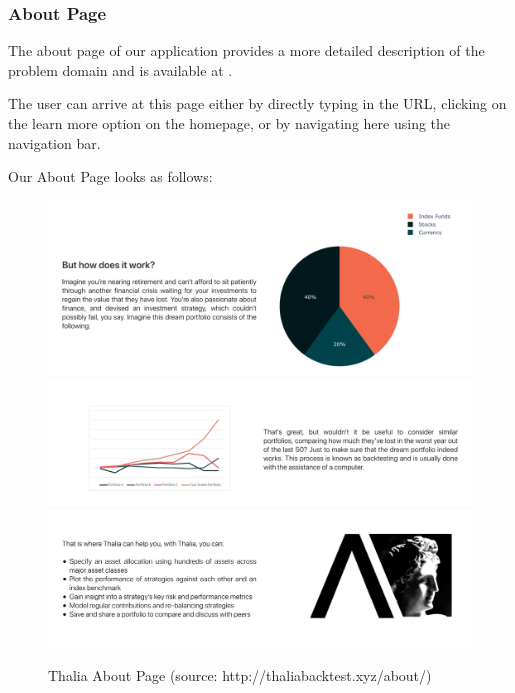 \documentclass[main.tex]{subfiles}
\begin{document}
\subsubsection{About Page}
The about page of our application provides a more detailed description of the problem domain and is available at .

The user can arrive at this page either by directly typing in the URL, clicking on the learn more option on the homepage, or by navigating here using the navigation bar.

Our About Page looks as follows:

\begin{figure}[H]
   \centering
   \includegraphics[width=\textwidth,keepaspectratio]{08Appendices/081User/081Pictures/about_1.png}
   \includegraphics[width=\textwidth,keepaspectratio]{08Appendices/081User/081Pictures/about_2.png}
   \includegraphics[width=\textwidth,keepaspectratio]{08Appendices/081User/081Pictures/about_3.png}
   \caption{Thalia About Page (source: http://thaliabacktest.xyz/about/)}
   \label{thalia_about}
\end{figure}
\end{document}
